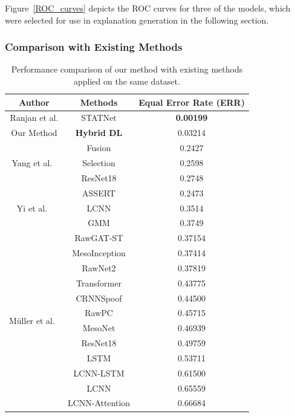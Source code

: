 \documentclass{article}
\begin{document}
Figure~\ref{ROC_curves} depicts the ROC curves for three of the models, which were selected for use in explanation generation in the following section.

\subsubsection{Comparison with Existing Methods}
\begin{table}
    \caption{Performance comparison of our method with existing methods applied on the same dataset.}
    \vspace{10pt}
    \centering
    \begin{tabular}{|c|c | c|}
        \hline
        \textbf{Author} & \textbf{Methods} & \textbf{Equal Error Rate (ERR)} \\ \hline
        Ranjan et al.\cite{ranjan_statnet_2022} & STATNet  & \textbf{0.00199} \\ \hline
        Our Method &\textbf{Hybrid DL} & 0.03214 \\  \hline
        \multirow{3}{*}{Yang et al.~\cite{yang_robust_2024}} &	Fusion & 0.2427 \\ \cline{2-3}
        &	Selection  & 0.2598 \\ \cline{2-3}
        &	ResNet18  & 0.2748 \\ \hline
        
        \multirow{3}{*}{Yi et al.~\cite{yi_audio_2023}}    &	ASSERT  & 0.2473 \\ \cline{2-3}
        &	LCNN  & 0.3514 \\ \cline{2-3}
        &	GMM & 0.3749 \\ \hline

        \multirow{12}{*}{Müller et al.~\cite{muller_does_2022}} 
        &	RawGAT-ST \cite{muller_does_2022} & 0.37154 \\ \cline{2-3}
        &	MesoInception \cite{muller_does_2022} & 0.37414 \\ \cline{2-3}        
        &	RawNet2  & 0.37819 \\ \cline{2-3}
        &	Transformer  & 0.43775 \\ \cline{2-3}
        &	CRNNSpoof & 0.44500 \\ \cline{2-3}
        &	RawPC  & 0.45715 \\ \cline{2-3}
        &	MesoNet & 0.46939 \\ \cline{2-3}
        &	ResNet18  & 0.49759 \\ \cline{2-3}
        &	LSTM  & 0.53711 \\ \cline{2-3}
        &	LCNN-LSTM  & 0.61500 \\ \cline{2-3}
        &	LCNN  & 0.65559 \\ \cline{2-3}
        &	LCNN-Attention  & 0.66684 \\ \hline
    \end{tabular}
    \label{table:other_results}
\end{table}
\end{document}
